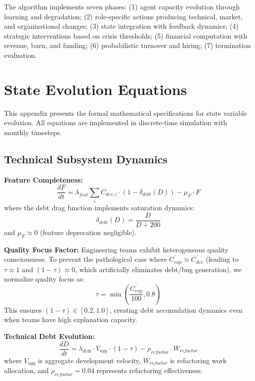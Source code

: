 \documentclass[alpha-refs]{wiley-article}
\begin{document}
The algorithm implements seven phases: (1) agent capacity evolution through learning and degradation; (2) role-specific actions producing technical, market, and organizational changes; (3) state integration with feedback dynamics; (4) strategic interventions based on crisis thresholds; (5) financial computation with revenue, burn, and funding; (6) probabilistic turnover and hiring; (7) termination evaluation.

\section{State Evolution Equations}
\label{app:equations}

This appendix presents the formal mathematical specifications for state variable evolution. All equations are implemented in discrete-time simulation with monthly timesteps.

\subsection{Technical Subsystem Dynamics}

\textbf{Feature Completeness:}
\begin{equation}
\frac{dF}{dt} = \lambda_{feat} \sum_i C_{dev,i} \cdot (1 - \delta_{debt}(D)) - \mu_F \cdot F
\end{equation}
where the debt drag function implements saturation dynamics:
\begin{equation}
\delta_{debt}(D) = \frac{D}{D + 200}
\end{equation}
and $\mu_F \approx 0$ (feature deprecation negligible).

\textbf{Quality Focus Factor:}
Engineering teams exhibit heterogeneous quality consciousness. To prevent the pathological case where $\overline{C_{exp}} \approx \overline{C_{dev}}$ (leading to $\tau \approx 1$ and $(1-\tau) \approx 0$, which artificially eliminates debt/bug generation), we normalize quality focus as:
\begin{equation}
\tau = \min\left(\frac{\overline{C_{exp}}}{100}, 0.8\right)
\end{equation}
This ensures $(1-\tau) \in [0.2, 1.0]$, creating debt accumulation dynamics even when teams have high explanation capacity.

\textbf{Technical Debt Evolution:}
\begin{equation}
\frac{dD}{dt} = \lambda_{debt} \cdot V_{agg} \cdot (1 - \tau) - \rho_{refactor} \cdot W_{refactor}
\end{equation}
where $V_{agg}$ is aggregate development velocity, $W_{refactor}$ is refactoring work allocation, and $\rho_{refactor} = 0.04$ represents refactoring effectiveness.
\end{document}
